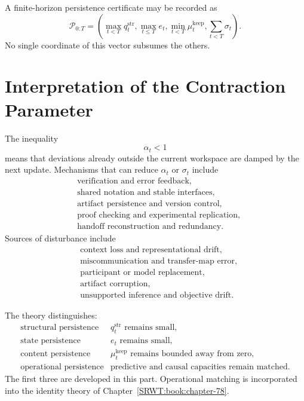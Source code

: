 A finite-horizon persistence certificate may be recorded as
\[
\boxed{
\mathcal P_{0:T}
=
\left(
\max_{t<T}q_t^{\mathrm{str}},
\max_{t\leq T}e_t,
\min_{t<T}\mu_t^{\mathrm{keep}},
\sum_{t<T}\sigma_t
\right).
}
\]
No single coordinate of this vector subsumes the others.

\section{Interpretation of the Contraction Parameter}

The inequality
\[
\alpha_t<1
\]
means that deviations already outside the current workspace are damped by the
next update. Mechanisms that can reduce \(\alpha_t\) or \(\sigma_t\) include
\[
\begin{aligned}
&\text{verification and error feedback},\\
&\text{shared notation and stable interfaces},\\
&\text{artifact persistence and version control},\\
&\text{proof checking and experimental replication},\\
&\text{handoff reconstruction and redundancy}.
\end{aligned}
\]
Sources of disturbance include
\[
\begin{aligned}
&\text{context loss and representational drift},\\
&\text{miscommunication and transfer-map error},\\
&\text{participant or model replacement},\\
&\text{artifact corruption},\\
&\text{unsupported inference and objective drift}.
\end{aligned}
\]


The theory distinguishes:
\[
\begin{array}{ll}
\text{structural persistence}
& q_t^{\mathrm{str}}\text{ remains small},\\
\text{state persistence}
& e_t\text{ remains small},\\
\text{content persistence}
& \mu_t^{\mathrm{keep}}\text{ remains bounded away from zero},\\
\text{operational persistence}
& \text{predictive and causal capacities remain matched}.
\end{array}
\]
The first three are developed in this part. Operational matching is incorporated
into the identity theory of Chapter~\ref{SRWT:book:chapter-78}.

